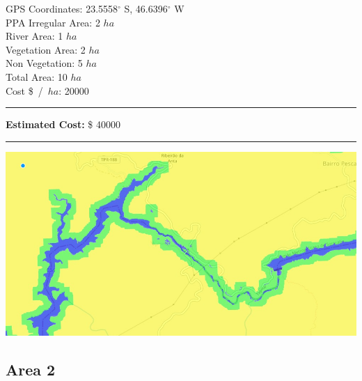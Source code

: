 \documentclass{article}
\begin{document}
    \begin{minipage}{0.5\linewidth}

    GPS Coordinates: 23.5558$^{\circ}$ S, 46.6396$^{\circ}$ W    \\
    PPA Irregular Area: 2 $ha$  \\
    River Area: 1 $ha$              \\
    Vegetation Area: 2 $ha$           \\
    Non Vegetation: 5 $ha$           \\
    Total Area: 10 $ha$              \\
    Cost \$~/~$ha$: 20000               \\
    \rule{\linewidth}{1pt}
    \textbf{Estimated Cost:} \$ 40000           \\
    \rule{\linewidth}{1pt}

    \end{minipage}\hfil
    \begin{minipage}{0.5\linewidth}
        \includegraphics[width=\linewidth]{map.jpg}
    \end{minipage}
    
    \subsection{Area 2}
\end{document}
